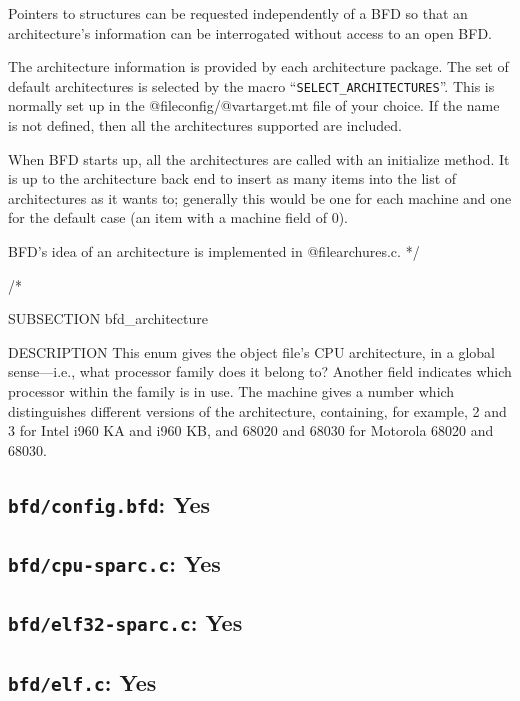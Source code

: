 Pointers to structures can be requested independently of a BFD
	so that an architecture's information can be interrogated
	without access to an open BFD.

	The architecture information is provided by each architecture package.
	The set of default architectures is selected by the macro
	``\texttt{SELECT\_ARCHITECTURES}''.  This is normally set up in the
	@file{config/@var{target}.mt} file of your choice.  If the name is not
	defined, then all the architectures supported are included.

	When BFD starts up, all the architectures are called with an
	initialize method.  It is up to the architecture back end to
	insert as many items into the list of architectures as it wants to;
	generally this would be one for each machine and one for the
	default case (an item with a machine field of 0).

	BFD's idea of an architecture is implemented in	@file{archures.c}.
*/

/*

SUBSECTION
	bfd\_architecture

DESCRIPTION
	This enum gives the object file's CPU architecture, in a
	global sense---i.e., what processor family does it belong to?
	Another field indicates which processor within
	the family is in use.  The machine gives a number which
	distinguishes different versions of the architecture,
	containing, for example, 2 and 3 for Intel i960 KA and i960 KB,
	and 68020 and 68030 for Motorola 68020 and 68030.



\subsection{\texttt{bfd/config.bfd}: Yes}
\label{sec:bfd:config.bfd}


\subsection{\texttt{bfd/cpu-sparc.c}: Yes}
\label{sec:bfd:cpu-sparc.c}


\subsection{\texttt{bfd/elf32-sparc.c}: Yes}
\label{sec:bfd:elf32-sparc.c}


\subsection{\texttt{bfd/elf.c}: Yes}
\label{sec:bfd:elf.c}

